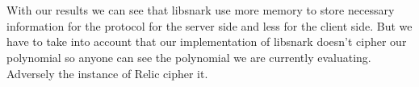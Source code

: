 \endgroup
\\
\\ With our results we can see that libsnark use more memory to store necessary information for the protocol for the server side and less for the client side. But we have to take into account that our implementation of libsnark doesn't cipher our polynomial so anyone can see the polynomial we are currently evaluating. Adversely the instance of Relic cipher it.